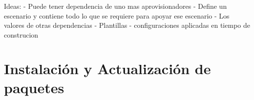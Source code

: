 Ideas:
- Puede tener dependencia de uno mas aprovisionadores
- Define un escenario y contiene todo lo que se requiere para apoyar ese escenario
  - Los valores de otras dependencias
  - Plantillas
- configuraciones aplicadas en tiempo de construcion



\section{Instalación y Actualización de paquetes}




